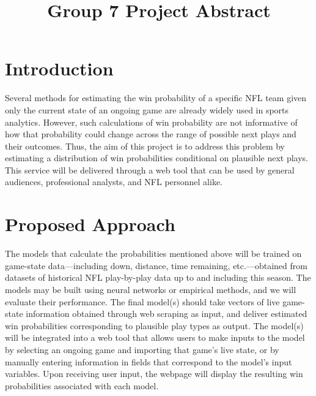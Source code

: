 \documentclass[conference]{IEEEtran}
\begin{document}
\title{Group 7 Project Abstract}

\author{
}

\maketitle

\enlargethispage{-12.5\baselineskip}

\section{Introduction}
Several methods for estimating the win probability of a specific NFL team given
only the current state of an ongoing game are already widely used in sports
analytics. However, such calculations of win probability are not informative of
how that probability could change across the range of possible next plays and
their outcomes. Thus, the aim of this project is to address this problem by
estimating a distribution of win probabilities conditional on plausible next
plays. This service will be delivered through a web tool that can be used by
general audiences, professional analysts, and NFL personnel alike.

\section{Proposed Approach}
The models that calculate the probabilities mentioned above will be trained on
game-state data---including down, distance, time remaining, etc.---obtained from
datasets of historical NFL play-by-play data up to and including this season.
The models may be built using neural networks or empirical methods, and we will
evaluate their performance. The final model(s) should take vectors of live
game-state information obtained through web scraping as input, and deliver
estimated win probabilities corresponding to plausible play types as output.
The model(s) will be integrated into a web tool that allows users to make inputs
to the model by selecting an ongoing game and importing that game's live state,
or by manually entering information in fields that correspond to the model's
input variables. Upon receiving user
input, the webpage will display the resulting win probabilities associated with
each model.
\end{document}
